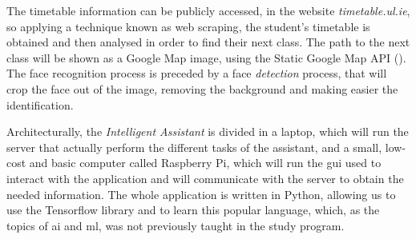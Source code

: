 The timetable information can be publicly accessed, in the website \textit{timetable.ul.ie}, so applying a technique known as web \gls{scraping}, the student's timetable is obtained and then analysed in order to find their next class. The path to the next class will be shown as a Google Map image, using the Static Google Map API (\cite{google_maps_static}). The face recognition process is preceded by a face \textit{detection} process, that will crop the face out of the image, removing the background and making easier the identification.

Architecturally, the \textit{Intelligent Assistant} is divided in a laptop, which will run the server that actually perform the different tasks of the assistant, and a small, low-cost and basic computer called Raspberry Pi, which will run the \gls{gui} used to interact with the application and will communicate with the server to obtain the needed information. The whole application is written in Python, allowing us to use the Tensorflow library and to learn this popular language, which, as the topics of \gls{ai} and \gls{ml}, was not previously taught in the study program. 

